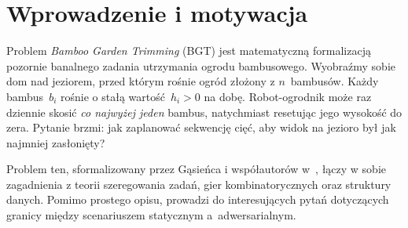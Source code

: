 \documentclass[12pt,a4paper]{article}
\theoremstyle{plain}
\theoremstyle{definition}
\theoremstyle{remark}
\newcommand{\RF}{\textsc{Reduce-Fastest}}
\newcommand{\RM}{\textsc{Reduce-Max}}
\begin{document}
\begin{abstract}
\noindent
Niniejszy raport omawia problem \emph{Bamboo Garden Trimming} (BGT) –
harmonogramowania wieczystego sekwencji cięć robota-ogrodnika dbającego
o ogród bambusowy. Zadanie polega na wyznaczeniu nieskończonego harmonogramu
cięć minimalizującego \emph{makespan}, czyli największą wysokość kiedykolwiek
osiągniętą przez dowolny bambus. Przedstawiamy formalny model BGT,
intuicję stojącą za redukcją do problemu Pinwheel Scheduling oraz dwie
naturalne strategie: \RM{} (przycinaj aktualnie najwyższy bambus) i
\RF$(x)$ (przycinaj najszybciej rosnący bambus spośród tych, które osiągnęły
próg~$x$). Omawiamy najważniejsze wyniki z~pracy Bilò i~wsp.: pierwsze
stałe ograniczenie górne~$9$ dla \RM{} oraz ograniczenie
$\tfrac{3+\sqrt{5}}{2} < 2{,}62$ dla~\RF$(x)$ przy
$x = 1 + \tfrac{1}{\sqrt{5}}$. Ostatnia część raportu opisuje naszą
implementację w~Pythonie i~Streamlit: interaktywną aplikację pozwalającą
symulować, porównywać i~testować omawiane strategie.
\end{abstract}

\newpage

\tableofcontents

\newpage

\section{Wprowadzenie i motywacja}

Problem \emph{Bamboo Garden Trimming} (BGT) jest matematyczną formalizacją
pozornie banalnego zadania utrzymania ogrodu bambusowego. Wyobraźmy sobie
dom nad jeziorem, przed którym rośnie ogród złożony z $n$~bambusów.
Każdy bambus~$b_i$ rośnie o stałą wartość~$h_i > 0$ na dobę.
Robot-ogrodnik może raz dziennie skosić \emph{co najwyżej jeden} bambus,
natychmiast resetując jego wysokość do zera. Pytanie brzmi: jak zaplanować
sekwencję cięć, aby widok na jezioro był jak najmniej zasłonięty?

Problem ten, sformalizowany przez G\k{a}sieńca i współautorów
w~\cite{gasieniec2017}, łączy w sobie zagadnienia z teorii szeregowania zadań,
gier kombinatorycznych oraz struktury danych. Pomimo prostego opisu,
prowadzi do interesujących pytań dotyczących granicy między scenariuszem
statycznym a~adwersarialnym.
\end{document}

